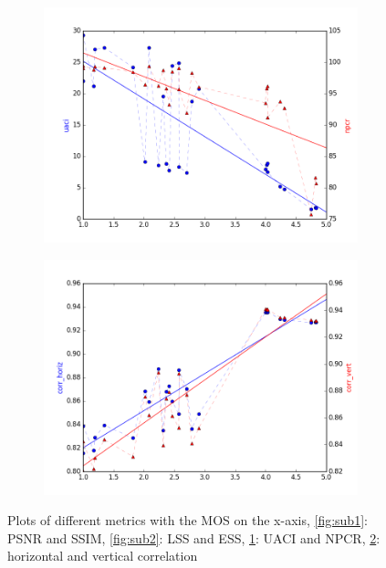 \documentclass{article}
\begin{document}
\begin{figure}[ht]
\begin{subfigure}{4.3cm}
  \includegraphics[width=1\linewidth]{figures/mos_npcr}
  \caption{}
  \label{fig:sub3}
\end{subfigure}%
\begin{subfigure}{4.3cm}
  \centering
  \includegraphics[width=1\linewidth]{figures/mos_corr_vert}
  \caption{}
  \label{fig:sub5}
\end{subfigure}%

\caption{Plots of different metrics with the MOS on the x-axis, \ref{fig:sub1}: PSNR and SSIM, \ref{fig:sub2}: LSS and ESS, \ref{fig:sub3}: UACI and NPCR, \ref{fig:sub5}: horizontal and vertical correlation}
\label{fig:plots}
\end{figure}
\end{document}
